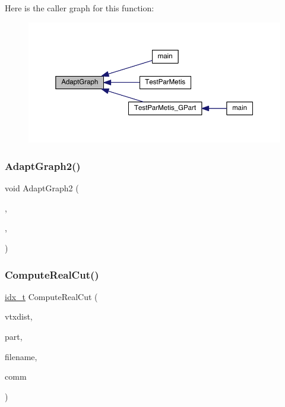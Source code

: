 Here is the caller graph for this function\+:\nopagebreak
\begin{figure}[H]
\begin{center}
\leavevmode
\includegraphics[width=350pt]{a00954_a6ff2574c60e68baf64eeab1b37f73cdf_icgraph}
\end{center}
\end{figure}
\mbox{\label{a00954_a0b7f332d1e5baf2185e681dbb12787b3}} 
\subsubsection{\texorpdfstring{Adapt\+Graph2()}{AdaptGraph2()}}
{\footnotesize\ttfamily void Adapt\+Graph2 (\begin{DoxyParamCaption}\item[{\hyperlink{a00734}{graph\+\_\+t} $\ast$}]{,  }\item[{\hyperlink{a00876_aaa5262be3e700770163401acb0150f52}{idx\+\_\+t}}]{,  }\item[{M\+P\+I\+\_\+\+Comm}]{ }\end{DoxyParamCaption})}

\mbox{\label{a00954_ae14ac8abf0f0bad98a84d811ae23cf7a}} 
\subsubsection{\texorpdfstring{Compute\+Real\+Cut()}{ComputeRealCut()}}
{\footnotesize\ttfamily \hyperlink{a00876_aaa5262be3e700770163401acb0150f52}{idx\+\_\+t} Compute\+Real\+Cut (\begin{DoxyParamCaption}\item[{\hyperlink{a00876_aaa5262be3e700770163401acb0150f52}{idx\+\_\+t} $\ast$}]{vtxdist,  }\item[{\hyperlink{a00876_aaa5262be3e700770163401acb0150f52}{idx\+\_\+t} $\ast$}]{part,  }\item[{char $\ast$}]{filename,  }\item[{M\+P\+I\+\_\+\+Comm}]{comm }\end{DoxyParamCaption})}

